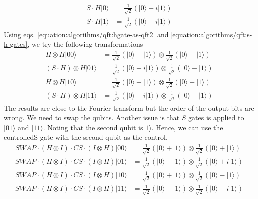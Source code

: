 \documentclass[letterpaper,10pt,english]{jupyterBook}
\begin{document}
\begin{align}
S \cdot H |0\rangle &= \frac{1}{\sqrt{2}}\left(|0\rangle + i |1\rangle\right) \\
S \cdot H |1\rangle &= \frac{1}{\sqrt{2}}\left(|0\rangle - i |1\rangle\right) \label{equation:algorithms/qft:qft4}
\end{align}
\sphinxAtStartPar
Using eqs. \eqref{equation:algorithms/qft:hgate-as-qft2} and \eqref{equation:algorithms/qft:s-h-gates}, we try the following transformations
\begin{align}
H \otimes H |00\rangle & = \frac{1}{\sqrt{2}} \left(|0\rangle + |1\rangle\right) \otimes
\frac{1}{\sqrt{2}} \left(|0\rangle + |1\rangle\right) \\
(S\cdot H) \otimes H |01\rangle & = \frac{1}{\sqrt{2}}\left(|0\rangle + i |1\rangle\right)  \otimes
 \frac{1}{\sqrt{2}} \left(|0\rangle - |1\rangle\right) \\
H \otimes H |10\rangle & = \frac{1}{\sqrt{2}} \left(|0\rangle - |1\rangle\right) \otimes
\frac{1}{\sqrt{2}} \left(|0\rangle + |1\rangle\right) \\
(S\cdot H) \otimes H |11\rangle & = \frac{1}{\sqrt{2}}\left(|0\rangle - i |1\rangle\right)  \otimes
 \frac{1}{\sqrt{2}} \left(|0\rangle - |1\rangle\right)
\end{align}
\sphinxAtStartPar
The results are close to the Fourier transform but the order of the output bits are wrong.  We need to swap the qubits.  Another issue is that \(S\) gates is applied to \(|01\rangle\) and \(|11\rangle\).  Noting that the second qubit is \(1\rangle\).  Hence, we can use the controlled\sphinxhyphen{}S gate with the second qubit as the control.
\begin{align}
SWAP \cdot (H \otimes I) \cdot CS \cdot (I \otimes H) |00\rangle & = \frac{1}{\sqrt{2}} \left(|0\rangle + |1\rangle\right) \otimes
\frac{1}{\sqrt{2}} \left(|0\rangle + |1\rangle\right) \\
SWAP \cdot (H \otimes I) \cdot CS \cdot (I \otimes H)  |01\rangle & = \frac{1}{\sqrt{2}} \left(|0\rangle - |1\rangle\right) \otimes  \frac{1} {\sqrt{2}}\left(|0\rangle + i |1\rangle\right)
 \\
SWAP \cdot (H \otimes I) \cdot CS \cdot (I \otimes H) |10\rangle  & = \frac{1}{\sqrt{2}} \left(|0\rangle + |1\rangle\right)  \otimes
 \frac{1}{\sqrt{2}} \left(|0\rangle - |1\rangle\right) \\
SWAP \cdot (H \otimes I) \cdot CS \cdot (I \otimes H) |11\rangle & =  \frac{1}{\sqrt{2}} \left(|0\rangle - |1\rangle\right)   \otimes
\frac{1}{\sqrt{2}}\left(|0\rangle - i |1\rangle\right)\label{equation:algorithms/qft:qft4-gates}
\end{align}
\end{document}
